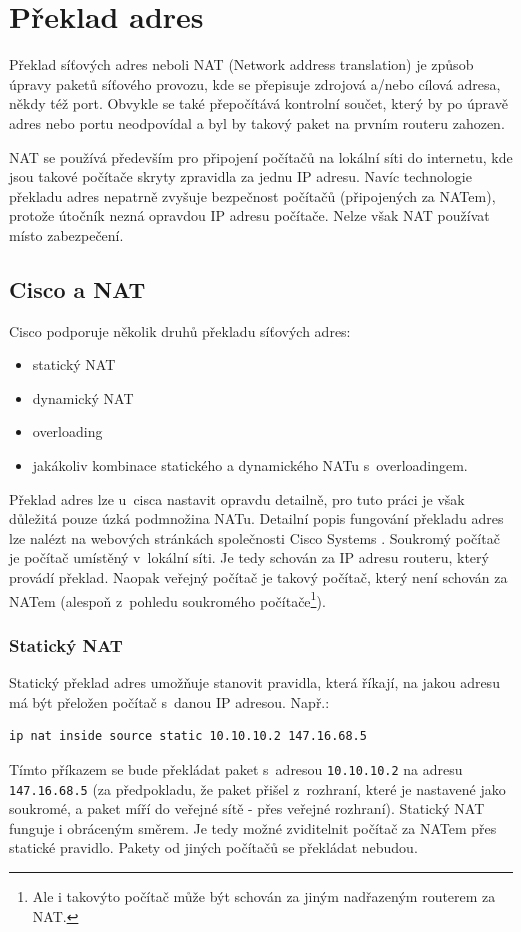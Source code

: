 \section{Překlad adres}

Překlad síťových adres neboli NAT (Network address translation) je způsob úpravy paketů síťového provozu, kde se přepisuje zdrojová a/nebo cílová adresa, někdy též port. Obvykle se také přepočítává kontrolní součet, který by po úpravě adres nebo portu neodpovídal a byl by takový paket na prvním routeru zahozen.

NAT se používá především pro připojení počítačů na lokální síti do internetu, kde jsou takové počítače skryty zpravidla za jednu IP adresu. Navíc technologie překladu adres nepatrně zvyšuje bezpečnost počítačů (připojených za NATem), protože útočník nezná opravdou IP adresu  počítače. Nelze však NAT používat místo zabezpečení.


\subsection{Cisco a NAT}
Cisco podporuje několik druhů překladu \cite{cisco:druhy} síťových adres:

\begin{itemize}
\item statický NAT
\item dynamický NAT
\item overloading
\item jakákoliv kombinace statického a dynamického NATu s~overloadingem.
\end{itemize}

Překlad adres lze u~cisca nastavit opravdu detailně, pro tuto práci je však důležitá pouze úzká podmnožina NATu. Detailní popis fungování překladu adres lze nalézt na webových stránkách společnosti Cisco Systems \cite{cisco:nat}.
Soukromý počítač je počítač umístěný v~lokální síti. Je tedy schován za IP adresu routeru, který provádí překlad. Naopak veřejný počítač je takový počítač, který není schován za NATem (alespoň z~pohledu soukromého počítače\footnote{Ale i takovýto počítač může být schován za jiným nadřazeným routerem za NAT.}).

\subsubsection{Statický NAT}
Statický překlad adres umožňuje stanovit pravidla, která říkají, na jakou adresu má být přeložen počítač s~danou IP adresou. Např.:
\begin{verbatim}
ip nat inside source static 10.10.10.2 147.16.68.5
\end{verbatim} 
Tímto příkazem se bude překládat paket s~adresou \verb|10.10.10.2| na adresu \verb|147.16.68.5| (za předpokladu, že paket přišel z~rozhraní, které je nastavené jako soukromé, a paket míří do veřejné sítě - přes veřejné rozhraní). Statický NAT funguje i obráceným směrem. Je tedy možné zviditelnit počítač za NATem přes statické pravidlo. Pakety od jiných počítačů se překládat nebudou. 

